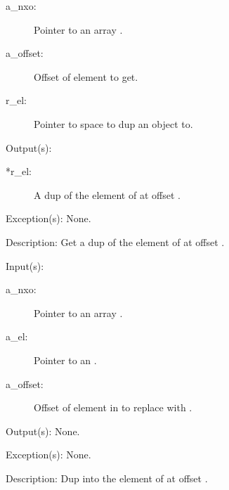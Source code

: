 \begin{capi}
\begin{capilist}
\begin{description}
		\item[a\_nxo: ]
			Pointer to an array .
		\item[a\_offset: ]
			Offset of element to get.
		\item[r\_el: ]
			Pointer to space to dup an object to.
		\end{description}
	\item[Output(s): ]
		\begin{description}\item[]
		\item[*r\_el: ]
			A dup of the element of  at offset
			.
		\end{description}
	\item[Exception(s): ] None.
	\item[Description: ]
		Get a dup of the element of  at offset
		.
	\end{capilist}
\label{nxo_array_el_set}
	\begin{capilist}
	\item[Input(s): ]
		\begin{description}\item[]
		\item[a\_nxo: ]
			Pointer to an array .
		\item[a\_el: ]
			Pointer to an .
		\item[a\_offset: ]
			Offset of element in  to replace with
			.
		\end{description}
	\item[Output(s): ] None.
	\item[Exception(s): ] None.
	\item[Description: ]
		Dup  into the element of  at offset
		.
	\end{capilist}
\end{capi}
